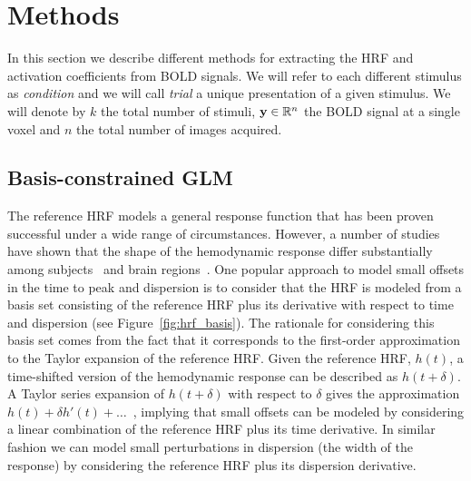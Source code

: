 
\section{Methods}

In this section we describe different methods for extracting the HRF and
activation coefficients from BOLD signals. We will refer to each different
stimulus as {\it condition} and we will call {\it trial} a unique presentation
of a given stimulus. We will denote by $k$ the total number of stimuli, $\mathbf{y} \in {\mathbb R}^n$
the BOLD signal at a single voxel and $n$ the total number of images acquired.

\subsection{Basis-constrained GLM}



The reference HRF models a general response function that has been proven successful under a wide range of circumstances. However, a number of studies have shown that the shape of the hemodynamic response differ substantially among subjects~\citep{Aguirre1998360} and brain regions~\citep{Schacter1997259}. One popular approach to model small offsets in the time to peak and dispersion is to consider that the HRF is modeled from a basis set consisting of the reference HRF plus its derivative with respect to time and dispersion (see Figure~\ref{fig:hrf_basis}). The rationale for considering this basis set comes from the fact that it corresponds to the first-order approximation to the Taylor expansion of the reference HRF. Given the reference HRF, $h(t)$, a time-shifted version of the hemodynamic response can be described as $h(t + \delta)$. A Taylor series expansion of $h(t + \delta)$ with respect to $\delta$ gives the approximation $h(t) + \delta h'(t) + \ldots$~, implying that small offsets can be modeled by considering a linear combination of the reference HRF plus its time derivative. In similar fashion we can model small perturbations in dispersion (the width of the response) by considering the reference HRF plus its dispersion derivative. 



